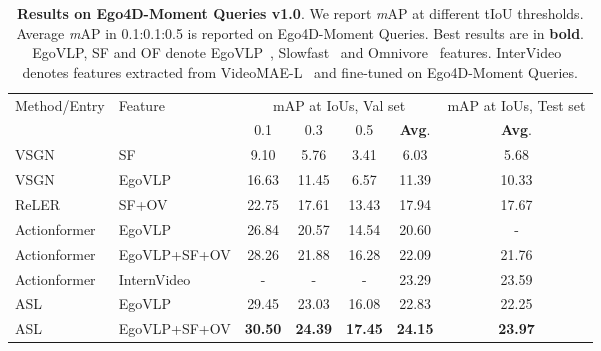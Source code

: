 \documentclass[10pt,twocolumn,letterpaper]{article}
\begin{document}
\begin{table*}[ht]
 \centering 
 \caption{\label{tab:result_ego4d} \textbf{Results on Ego4D-Moment Queries v1.0}. We report \textit{m}AP at different tIoU thresholds. Average \textit{m}AP in 0.1:0.1:0.5 is reported on Ego4D-Moment Queries. Best results are in \textbf{bold}. EgoVLP, SF and OF denote EgoVLP~\cite{kevin2022egovlp}, Slowfast~\cite{slowfast} and Omnivore~\cite{girdhar2022omnivore} features. InterVideo~\cite{ego4dinternvideo} denotes features extracted from VideoMAE-L~\cite{tong2022videomae} and fine-tuned on Ego4D-Moment Queries.}
 \vspace{0.5em}
 \small
 {
  \begin{tabular}{l|l|cccc|c}
  \toprule
  \multirow{2}{*}{Method/Entry} & \multirow{2}{*}{Feature} & \multicolumn{4}{c}{mAP at IoUs, Val set} & \multicolumn{1}{c}{mAP at IoUs, Test set} \tabularnewline
 & & 0.1  & 0.3 & 0.5 & \textbf{Avg}. & \textbf{Avg}.   \tabularnewline
    \hline
    VSGN~\cite{vsgn} & SF & 9.10 & 5.76 & 3.41 & 6.03 & 5.68  \tabularnewline
    VSGN~\cite{kevin2022egovlp} & EgoVLP & 16.63 & 11.45 & 6.57 & 11.39 & 10.33  \tabularnewline
    ReLER~\cite{ego4dreler} & SF+OV & 22.75 & 17.61 & 13.43 & 17.94 & 17.67 \tabularnewline
    Actionformer~\cite{ego4dactionformer} & EgoVLP & 26.84 & 20.57 & 14.54 & 20.60 & - \tabularnewline
    Actionformer~\cite{ego4dactionformer} & EgoVLP+SF+OV & 28.26 & 21.88 & 16.28 & 22.09  & 21.76 \tabularnewline
    \textcolor{halfgray}{Actionformer~\cite{ego4dinternvideo}} & \textcolor{halfgray}{InternVideo} & \textcolor{halfgray}{-} & \textcolor{halfgray}{-} & \textcolor{halfgray}{-} & \textcolor{halfgray}{23.29}  & \textcolor{halfgray}{23.59}  \tabularnewline
   \hline
    ASL & EgoVLP & 29.45 & 23.03 & 16.08 & 22.83  & 22.25 \tabularnewline
    ASL & EgoVLP+SF+OV & \textbf{30.50} & \textbf{24.39} & \textbf{17.45} & \textbf{24.15} & \textbf{23.97}  \tabularnewline
 \bottomrule
  \end{tabular}
}
\end{table*}
\end{document}
